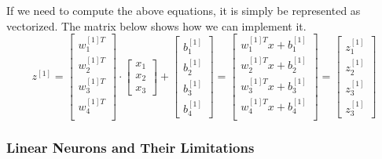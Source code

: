 If we need to compute the above equations, it is simply be represented as vectorized. The matrix below shows how we can implement it.%
\[
z^{[1]} = 
\left[
 \begin{array}{ccc}
   w^{[1]T}_{1} \\
   w^{[1]T}_{2} \\
   w^{[1]T}_{3} \\
   w^{[1]T}_{4} \\ 
 \end{array}
\right]\cdot
\left[
 \begin{array}{c}
  x_{1} \\
  x_{2} \\
  x_{3} %
 \end{array}
\right] +
\left[
 \begin{array}{c}
  b_{1}^{[1]}\\
  b_{2}^{[1]}\\
  b_{3}^{[1]}\\
  b_{4}^{[1]}
 \end{array}
\right] =
\left[
 \begin{array}{cccc}
   w^{[1]T}_{1} x + b _1^{[1]}\\
   w^{[1]T}_{2} x + b _2^{[1] }\\
   w^{[1]T}_{3} x + b _3^{[1] }\\
   w^{[1]T}_{4} x + b _4^{[1] }\\ 
 \end{array}
\right] =
\left[
 \begin{array}{c}
  z_1^{[1]} \\
  z_2^{[1]} \\
  z_3^{[1]} \\
  z_3^{[1]}
 \end{array}
\right]
\]%
\subsubsection{Linear Neurons and Their Limitations}

